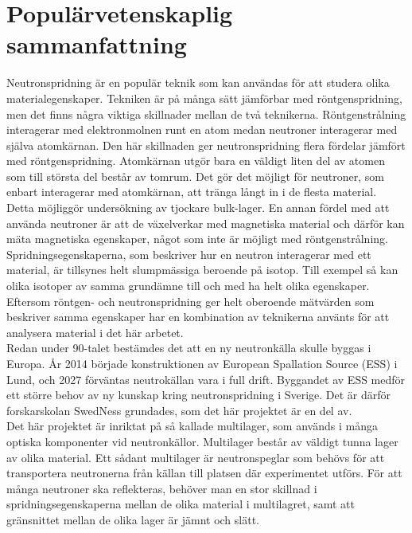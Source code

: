 \chapter{Populärvetenskaplig sammanfattning}
Neutronspridning är en populär teknik som kan användas för att studera olika materialegenskaper. Tekniken är på många sätt jämförbar med röntgenspridning, men det finns några viktiga skillnader mellan de två teknikerna. Röntgenstrålning interagerar med elektronmolnen runt en atom medan neutroner interagerar med själva atomkärnan. Den här skillnaden ger neutronspridning flera fördelar jämfört med röntgenspridning. Atomkärnan utgör bara en väldigt liten del av atomen som till största del består av tomrum. Det gör det möjligt för neutroner, som enbart interagerar med atomkärnan, att tränga långt in i de flesta material. Detta möjliggör undersökning av tjockare bulk-lager. En annan fördel med att använda neutroner är att de växelverkar med magnetiska material och därför kan mäta magnetiska egenskaper, något som inte är möjligt med röntgenstrålning. Spridningsegenskaperna, som beskriver hur en neutron interagerar med ett material, är tillsynes helt slumpmässiga beroende på isotop. Till exempel så kan olika isotoper av samma grundämne till och med ha helt olika egenskaper. Eftersom röntgen- och neutronspridning ger helt oberoende mätvärden som beskriver samma egenskaper har en kombination av teknikerna använts för att analysera material i det här arbetet. \\
Redan under 90-talet bestämdes det att en ny neutronkälla skulle byggas i Europa. År 2014 började konstruktionen av European Spallation Source (ESS) i Lund, och 2027 förväntas neutrokällan vara i full drift. Byggandet av ESS medför ett större behov av ny kunskap kring neutronspridning i Sverige. Det är därför forskarskolan SwedNess grundades, som det här projektet är en del av. \\
Det här projektet är inriktat på så kallade multilager, som används i många optiska komponenter vid neutronkällor. Multilager består av väldigt tunna lager av olika material. Ett sådant multilager är neutronspeglar som behövs för att transportera neutronerna från källan till platsen där experimentet utförs. För att många neutroner ska reflekteras, behöver man en stor skillnad i spridningsegenskaperna mellan de olika material i multilagret, samt att gränsnittet mellan de olika lager är jämnt och slätt.

